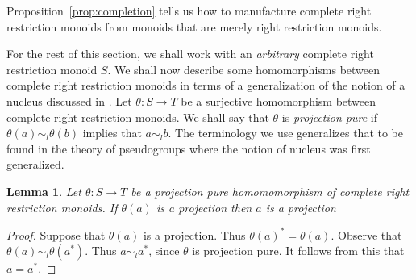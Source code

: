 \documentclass[a4paper]{amsart}
\newtheorem{lemma}[theorem]{Lemma}
\begin{document}
Proposition~\ref{prop:completion} tells us how to manufacture complete right restriction monoids
from monoids that are merely right restriction monoids. 

For the rest of this section, we shall work with an {\em arbitrary} complete right restriction monoid $S$.
We shall now describe some homomorphisms between complete right restriction monoids 
in terms of a generalization of the notion of a nucleus discussed in \cite{J}.
Let $\theta \colon S \rightarrow T$ be a surjective homomorphism
between complete right restriction monoids.
We shall say that $\theta$ is {\em projection pure}
if $\theta (a) \sim_{l} \theta (b)$ implies that $a \sim_{l} b$.
The terminology we use generalizes that to be found in the theory of pseudogroups \cite{LL}
where the notion of nucleus was first generalized.  

\begin{lemma}\label{lem:projection-pure-projection} Let $\theta \colon S \rightarrow T$ be a projection pure homomomorphism
of complete right restriction monoids.
If $\theta (a)$ is a projection then $a$ is a projection
\end{lemma}
\begin{proof} Suppose that $\theta (a)$ is a projection.
Thus $\theta (a)^{\ast} = \theta (a)$.
Observe that $\theta (a) \sim_{l} \theta (a^{\ast})$.
Thus $a \sim_{l} a^{\ast}$, since $\theta$ is projection pure.
It follows from this that $a = a^{\ast}$. 
\end{proof}
\end{document}

